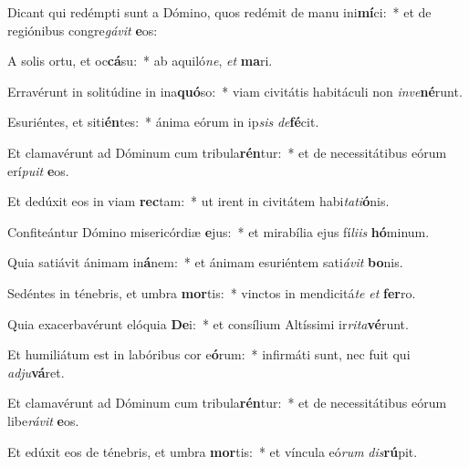 \item Dicant qui redémpti sunt a Dómino, quos redémit de manu ini\textbf{mí}ci:~* et de regiónibus congre\textit{gá}\textit{vit} \textbf{e}os:
\item A solis ortu, et oc\textbf{cá}su:~* ab aquiló\textit{ne}, \textit{et} \textbf{ma}ri.
\item Erravérunt in solitúdine in ina\textbf{quó}so:~* viam civitátis habitáculi non \textit{in}\textit{ve}\textbf{né}runt.
\item Esuriéntes, et siti\textbf{én}tes:~* ánima eórum in ip\textit{sis} \textit{de}\textbf{fé}cit.
\item Et clamavérunt ad Dóminum cum tribula\textbf{rén}tur:~* et de necessitátibus eórum erí\textit{pu}\textit{it} \textbf{e}os.
\item Et dedúxit eos in viam \textbf{rec}tam:~* ut irent in civitátem habi\textit{ta}\textit{ti}\textbf{ó}nis.
\item Confiteántur Dómino misericórdiæ \textbf{e}jus:~* et mirabília ejus fí\textit{li}\textit{is} \textbf{hó}minum.
\item Quia satiávit ánimam in\textbf{á}nem:~* et ánimam esuriéntem sati\textit{á}\textit{vit} \textbf{bo}nis.
\item Sedéntes in ténebris, et umbra \textbf{mor}tis:~* vinctos in mendicitá\textit{te} \textit{et} \textbf{fer}ro.
\item Quia exacerbavérunt elóquia \textbf{De}i:~* et consílium Altíssimi ir\textit{ri}\textit{ta}\textbf{vé}runt.
\item Et humiliátum est in labóribus cor e\textbf{ó}rum:~* infirmáti sunt, nec fuit qui \textit{ad}\textit{ju}\textbf{vá}ret.
\item Et clamavérunt ad Dóminum cum tribula\textbf{rén}tur:~* et de necessitátibus eórum libe\textit{rá}\textit{vit} \textbf{e}os.
\item Et edúxit eos de ténebris, et umbra \textbf{mor}tis:~* et víncula eó\textit{rum} \textit{dis}\textbf{rú}pit.
